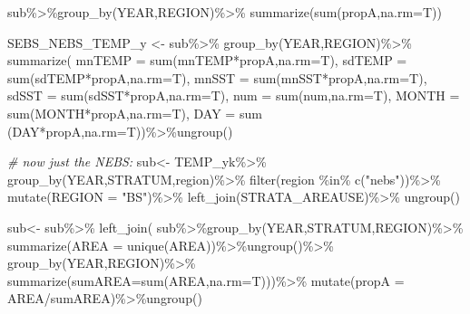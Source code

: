 \documentclass[
]{article}
\newenvironment{Shaded}{\begin{snugshade}}{\end{snugshade}}
\newcommand{\AttributeTok}[1]{\textcolor[rgb]{0.77,0.63,0.00}{#1}}
\newcommand{\CommentTok}[1]{\textcolor[rgb]{0.56,0.35,0.01}{\textit{#1}}}
\newcommand{\FunctionTok}[1]{\textcolor[rgb]{0.00,0.00,0.00}{#1}}
\newcommand{\NormalTok}[1]{#1}
\newcommand{\OtherTok}[1]{\textcolor[rgb]{0.56,0.35,0.01}{#1}}
\newcommand{\SpecialCharTok}[1]{\textcolor[rgb]{0.00,0.00,0.00}{#1}}
\newcommand{\StringTok}[1]{\textcolor[rgb]{0.31,0.60,0.02}{#1}}
\begin{document}
\begin{Shaded}
\begin{Highlighting}[]
  
\NormalTok{  sub}\SpecialCharTok{\%\textgreater{}\%}\FunctionTok{group\_by}\NormalTok{(YEAR,REGION)}\SpecialCharTok{\%\textgreater{}\%}
        \FunctionTok{summarize}\NormalTok{(}\FunctionTok{sum}\NormalTok{(propA,}\AttributeTok{na.rm=}\NormalTok{T))}
  
  
\NormalTok{  SEBS\_NEBS\_TEMP\_y }\OtherTok{\textless{}{-}}\NormalTok{ sub}\SpecialCharTok{\%\textgreater{}\%}
    \FunctionTok{group\_by}\NormalTok{(YEAR,REGION)}\SpecialCharTok{\%\textgreater{}\%}
    \FunctionTok{summarize}\NormalTok{(}
        \AttributeTok{mnTEMP =} \FunctionTok{sum}\NormalTok{(mnTEMP}\SpecialCharTok{*}\NormalTok{propA,}\AttributeTok{na.rm=}\NormalTok{T),}
        \AttributeTok{sdTEMP =} \FunctionTok{sum}\NormalTok{(sdTEMP}\SpecialCharTok{*}\NormalTok{propA,}\AttributeTok{na.rm=}\NormalTok{T),}
        \AttributeTok{mnSST  =} \FunctionTok{sum}\NormalTok{(mnSST}\SpecialCharTok{*}\NormalTok{propA,}\AttributeTok{na.rm=}\NormalTok{T),}
        \AttributeTok{sdSST  =} \FunctionTok{sum}\NormalTok{(sdSST}\SpecialCharTok{*}\NormalTok{propA,}\AttributeTok{na.rm=}\NormalTok{T),}
        \AttributeTok{num    =} \FunctionTok{sum}\NormalTok{(num,}\AttributeTok{na.rm=}\NormalTok{T),}
        \AttributeTok{MONTH  =} \FunctionTok{sum}\NormalTok{(MONTH}\SpecialCharTok{*}\NormalTok{propA,}\AttributeTok{na.rm=}\NormalTok{T),}
        \AttributeTok{DAY    =} \FunctionTok{sum}\NormalTok{ (DAY}\SpecialCharTok{*}\NormalTok{propA,}\AttributeTok{na.rm=}\NormalTok{T))}\SpecialCharTok{\%\textgreater{}\%}\FunctionTok{ungroup}\NormalTok{()}
  
  \CommentTok{\# now just the NEBS:}
\NormalTok{  sub}\OtherTok{\textless{}{-}}\NormalTok{ TEMP\_yk}\SpecialCharTok{\%\textgreater{}\%}
    \FunctionTok{group\_by}\NormalTok{(YEAR,STRATUM,region)}\SpecialCharTok{\%\textgreater{}\%}
    \FunctionTok{filter}\NormalTok{(region }\SpecialCharTok{\%in\%} \FunctionTok{c}\NormalTok{(}\StringTok{"nebs"}\NormalTok{))}\SpecialCharTok{\%\textgreater{}\%}
    \FunctionTok{mutate}\NormalTok{(}\AttributeTok{REGION =} \StringTok{"BS"}\NormalTok{)}\SpecialCharTok{\%\textgreater{}\%}
    \FunctionTok{left\_join}\NormalTok{(STRATA\_AREAUSE)}\SpecialCharTok{\%\textgreater{}\%}
    \FunctionTok{ungroup}\NormalTok{()}
  
\NormalTok{  sub}\OtherTok{\textless{}{-}}\NormalTok{ sub}\SpecialCharTok{\%\textgreater{}\%}
    \FunctionTok{left\_join}\NormalTok{(}
\NormalTok{      sub}\SpecialCharTok{\%\textgreater{}\%}\FunctionTok{group\_by}\NormalTok{(YEAR,STRATUM,REGION)}\SpecialCharTok{\%\textgreater{}\%}
        \FunctionTok{summarize}\NormalTok{(}\AttributeTok{AREA =} \FunctionTok{unique}\NormalTok{(AREA))}\SpecialCharTok{\%\textgreater{}\%}\FunctionTok{ungroup}\NormalTok{()}\SpecialCharTok{\%\textgreater{}\%}
        \FunctionTok{group\_by}\NormalTok{(YEAR,REGION)}\SpecialCharTok{\%\textgreater{}\%}
        \FunctionTok{summarize}\NormalTok{(}\AttributeTok{sumAREA=}\FunctionTok{sum}\NormalTok{(AREA,}\AttributeTok{na.rm=}\NormalTok{T)))}\SpecialCharTok{\%\textgreater{}\%}
    \FunctionTok{mutate}\NormalTok{(}\AttributeTok{propA =}\NormalTok{ AREA}\SpecialCharTok{/}\NormalTok{sumAREA)}\SpecialCharTok{\%\textgreater{}\%}\FunctionTok{ungroup}\NormalTok{()}
  

\end{Highlighting}
\end{Shaded}
\end{document}
